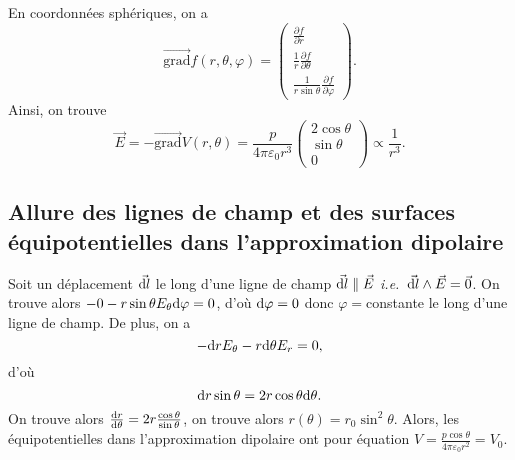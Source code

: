 En coordonnées sphériques, on a 
\begin{equation}
    \overrightarrow{\mathrm{grad}}f(r,\theta,\varphi)=\begin{pmatrix}
        \frac{\partial f}{\partial r}\\\frac{1}{r}\frac{\partial f}{\partial \theta}\\\frac{1}{r\sin\theta}\frac{\partial f}{\partial\varphi}
    \end{pmatrix}.
\end{equation}
Ainsi, on trouve
\begin{equation}
    \boxed{
        \vec{E}=-\overrightarrow{\mathrm{grad}}V(r,\theta)=\frac{p}{4\pi\varepsilon_0 r^{3}}\begin{pmatrix}
            2\cos\theta\\\sin\theta\\0
        \end{pmatrix}
    }\propto\frac{1}{r^{3}}.
\end{equation}

\subsection{Allure des lignes de champ et des surfaces équipotentielles dans l'approximation dipolaire}

Soit un déplacement $\vec{\mathrm{d} l}$ le long d'une ligne de champ $\vec{\mathrm{d} l}\parallel\vec{E}$ \emph{i.e.~}$\vec{\mathrm{d} l}\wedge\vec{E}=\vec{0}$. On trouve alors $-0-r\sin\theta E_{\theta}\mathrm{d}\varphi=0$, d'où $\mathrm{d}\varphi=0$ donc $\varphi=$constante le long d'une ligne de champ. De plus, on a 
\begin{equation}
    -\mathrm{d} rE_{\theta}-r\mathrm{d}\theta E_r=0,
\end{equation}
d'où
\begin{equation}
    \mathrm{d} r\sin\theta=2r\cos\theta\mathrm{d}\theta.
\end{equation}
On trouve alors $\frac{\mathrm{d} r}{\mathrm{d}\theta}=2r\frac{\cos\theta}{\sin\theta}$, on trouve alors $r(\theta)=r_0\sin^{2}\theta$. Alors, les équipotentielles dans l'approximation dipolaire ont pour équation $V=\frac{p\cos\theta}{4\pi\varepsilon_0 r^{2}}=V_0$.
